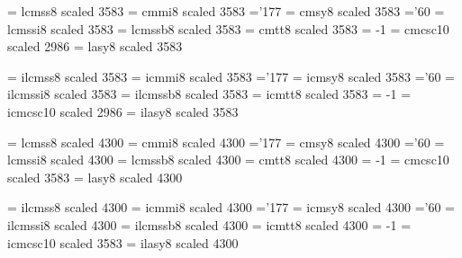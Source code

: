 \font\twentyninerm   = lcmss8  scaled 3583 %
\font\twentyninei    = cmmi8   scaled 3583 %
    \skewchar\twentyninei ='177                  %
\font\twentyninesy   = cmsy8   scaled 3583 %
    \skewchar\twentyninesy ='60           %
\font\twentynineit   = lcmssi8 scaled 3583 %
\font\twentyninebf   = lcmssb8 scaled 3583 %
\font\twentyninett   = cmtt8   scaled 3583 %
    \hyphenchar\twentyninett = -1         %
\font\twentyninesc   = cmcsc10 scaled 2986 %
\font\twentyninelasy = lasy8  scaled 3583 %
 
\font\itwentyninerm   = ilcmss8  scaled 3583 %
\font\itwentyninei    = icmmi8   scaled 3583 %
    \skewchar\itwentyninei ='177                  %
\font\itwentyninesy   = icmsy8   scaled 3583 %
    \skewchar\itwentyninesy ='60           %
\font\itwentynineit   = ilcmssi8 scaled 3583 %
\font\itwentyninebf   = ilcmssb8 scaled 3583 %
\font\itwentyninett   = icmtt8   scaled 3583 %
    \hyphenchar\itwentyninett = -1         %
\font\itwentyninesc   = icmcsc10 scaled 2986 %
\font\itwentyninelasy = ilasy8  scaled 3583 %
 
\font\thirtyfourrm   = lcmss8  scaled 4300 %
\font\thirtyfouri    = cmmi8   scaled 4300 %
    \skewchar\thirtyfouri ='177                  %
\font\thirtyfoursy   = cmsy8   scaled 4300 %
    \skewchar\thirtyfoursy ='60           %
\font\thirtyfourit   = lcmssi8 scaled 4300 %
\font\thirtyfourbf   = lcmssb8 scaled 4300 %
\font\thirtyfourtt   = cmtt8   scaled 4300 %
    \hyphenchar\thirtyfourtt = -1         %
\font\thirtyfoursc   = cmcsc10 scaled 3583 %
\font\thirtyfourlasy = lasy8  scaled 4300 %
 
\font\ithirtyfourrm   = ilcmss8  scaled 4300 %
\font\ithirtyfouri    = icmmi8   scaled 4300 %
    \skewchar\ithirtyfouri ='177                  %
\font\ithirtyfoursy   = icmsy8   scaled 4300 %
    \skewchar\ithirtyfoursy ='60           %
\font\ithirtyfourit   = ilcmssi8 scaled 4300 %
\font\ithirtyfourbf   = ilcmssb8 scaled 4300 %
\font\ithirtyfourtt   = icmtt8   scaled 4300 %
    \hyphenchar\ithirtyfourtt = -1         %
\font\ithirtyfoursc   = icmcsc10 scaled 3583 %
\font\ithirtyfourlasy = ilasy8  scaled 4300 %
 
